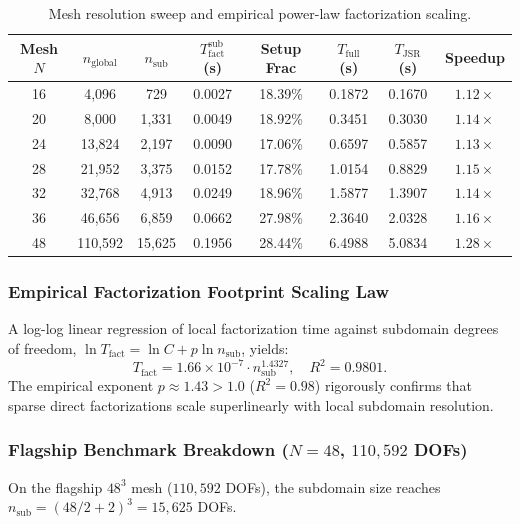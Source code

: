 \documentclass[preprint,12pt,3p]{elsarticle}
\begin{document}
\begin{table}[htbp]
\centering
\small
\caption{Mesh resolution sweep and empirical power-law factorization scaling.}
\label{tab:pillar5_scaling}
\begin{tabular}{cccccccc}
\toprule
Mesh $N$ & $n_{\text{global}}$ & $n_{\text{sub}}$ & $T_{\text{fact}}^{\text{sub}}$ (s) & Setup Frac & $T_{\text{full}}$ (s) & $T_{\text{JSR}}$ (s) & Speedup \\
\midrule
16 & 4,096 & 729 & 0.0027 & 18.39\% & 0.1872 & 0.1670 & $1.12\times$ \\
20 & 8,000 & 1,331 & 0.0049 & 18.92\% & 0.3451 & 0.3030 & $1.14\times$ \\
24 & 13,824 & 2,197 & 0.0090 & 17.06\% & 0.6597 & 0.5857 & $1.13\times$ \\
28 & 21,952 & 3,375 & 0.0152 & 17.78\% & 1.0154 & 0.8829 & $1.15\times$ \\
32 & 32,768 & 4,913 & 0.0249 & 18.96\% & 1.5877 & 1.3907 & $1.14\times$ \\
36 & 46,656 & 6,859 & 0.0662 & 27.98\% & 2.3640 & 2.0328 & $1.16\times$ \\
48 & 110,592 & 15,625 & 0.1956 & 28.44\% & 6.4988 & 5.0834 & $\mathbf{1.28\times}$ \\
\bottomrule
\end{tabular}
\end{table}

\subsubsection{Empirical Factorization Footprint Scaling Law}
A log-log linear regression of local factorization time against subdomain degrees of freedom, $\ln T_{\text{fact}} = \ln C + p \ln n_{\text{sub}}$, yields:
\begin{equation}
T_{\text{fact}} = 1.66 \times 10^{-7} \cdot n_{\text{sub}}^{1.4327}, \quad R^2 = 0.9801.
\label{eq:power_law}
\end{equation}
The empirical exponent $p \approx 1.43 > 1.0$ ($R^2 = 0.98$) rigorously confirms that sparse direct factorizations scale superlinearly with local subdomain resolution.

\subsubsection{Flagship Benchmark Breakdown ($N=48$, $110,592$ DOFs)}
On the flagship $48^3$ mesh ($110,592$ DOFs), the subdomain size reaches $n_{\text{sub}} = (48/2 + 2)^3 = 15,625$ DOFs.
\end{document}
